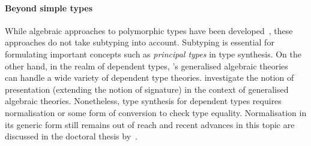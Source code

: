 
\paragraph{Beyond simple types}
While algebraic approaches to polymorphic types have been developed~\citep{Fiore2013,Hamana2011}, these approaches do not take subtyping into account.
Subtyping is essential for formulating important concepts such as \emph{principal types} in type synthesis.
On the other hand, in the realm of dependent types, \citeauthor{Cartmell1986}'s generalised algebraic theories~\citeyearpar{Cartmell1986} can handle a wide variety of dependent type theories.
\citet{Bezem2021} investigate the notion of presentation (extending the notion of signature) in the context of generalised algebraic theories.
Nonetheless, type synthesis for dependent types requires normalisation or some form of conversion to check type equality.
Normalisation in its generic form still remains out of reach and recent advances in this topic are discussed in the doctoral thesis by~\citet{Valliappan2023}.



%


